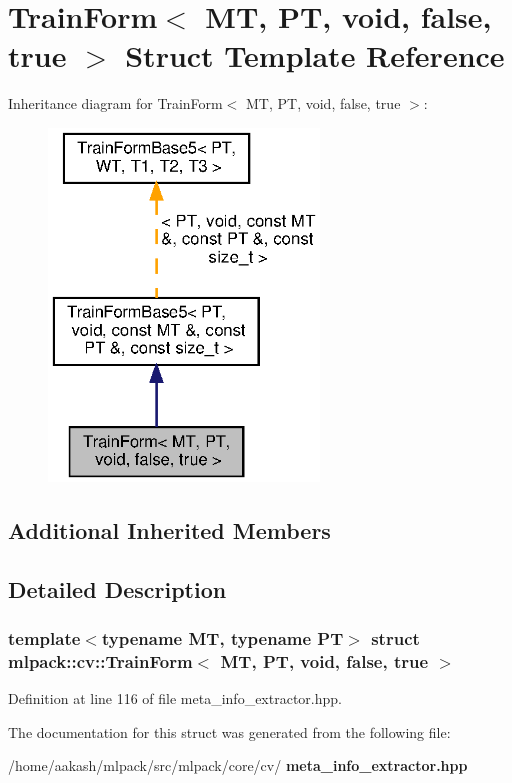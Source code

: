 \section{Train\+Form$<$ MT, PT, void, false, true $>$ Struct Template Reference}
\label{structmlpack_1_1cv_1_1TrainForm_3_01MT_00_01PT_00_01void_00_01false_00_01true_01_4}


Inheritance diagram for Train\+Form$<$ MT, PT, void, false, true $>$\+:
\nopagebreak
\begin{figure}[H]
\begin{center}
\leavevmode
\includegraphics[width=204pt]{structmlpack_1_1cv_1_1TrainForm_3_01MT_00_01PT_00_01void_00_01false_00_01true_01_4__inherit__graph}
\end{center}
\end{figure}
\subsection*{Additional Inherited Members}


\subsection{Detailed Description}
\subsubsection*{template$<$typename MT, typename PT$>$\newline
struct mlpack\+::cv\+::\+Train\+Form$<$ M\+T, P\+T, void, false, true $>$}



Definition at line 116 of file meta\+\_\+info\+\_\+extractor.\+hpp.



The documentation for this struct was generated from the following file\+:\begin{DoxyCompactItemize}
\item 
/home/aakash/mlpack/src/mlpack/core/cv/\textbf{ meta\+\_\+info\+\_\+extractor.\+hpp}\end{DoxyCompactItemize}
